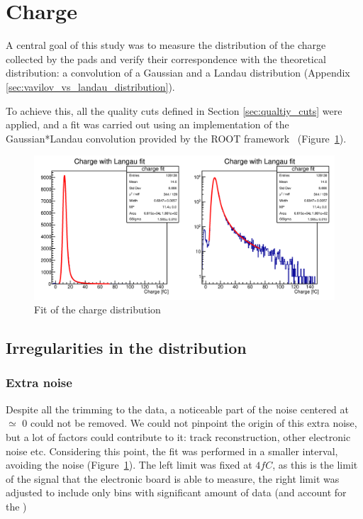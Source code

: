 \section{Charge}

A central goal of this study was to measure the distribution of the charge collected by the pads and verify their correspondence with the theoretical distribution: a convolution of a Gaussian and a Landau distribution (Appendix \ref{sec:vavilov_vs_landau_distribution}).

To achieve this, all the quality cuts defined in Section \ref{sec:qualtiy_cuts} were applied, and a fit was carried out using an implementation of the Gaussian*Landau convolution provided by the ROOT framework~\cite{Brun:1997pa} (Figure~\ref{fig:charge_ROOT_fit}). 

\begin{figure}[!ht]
    \centering
    \includegraphics[width=1\textwidth]{Images/charge_plots/charge_data_all_cuts_401_S1_3_Charge_fit_ROOT_double_plot.png}
    \caption{Fit of the charge distribution}
    \label{fig:charge_ROOT_fit}
\end{figure}

\subsection{Irregularities in the distribution}

\subsubsection{Extra noise}
Despite all the trimming to the data, a noticeable part of the noise centered at $\simeq$ 0 could not be removed. We could not pinpoint the origin of this extra noise, but a lot of factors could contribute to it: track reconstruction, other electronic noise etc.
Considering this point, the fit was performed in a smaller interval, avoiding the noise (Figure~\ref{fig:charge_ROOT_fit}). The left limit was fixed at $4\si{fC}$, as this is the limit of the signal that the electronic board is able to measure, the right limit was adjusted to include only bins with significant amount of data (and account for the )

